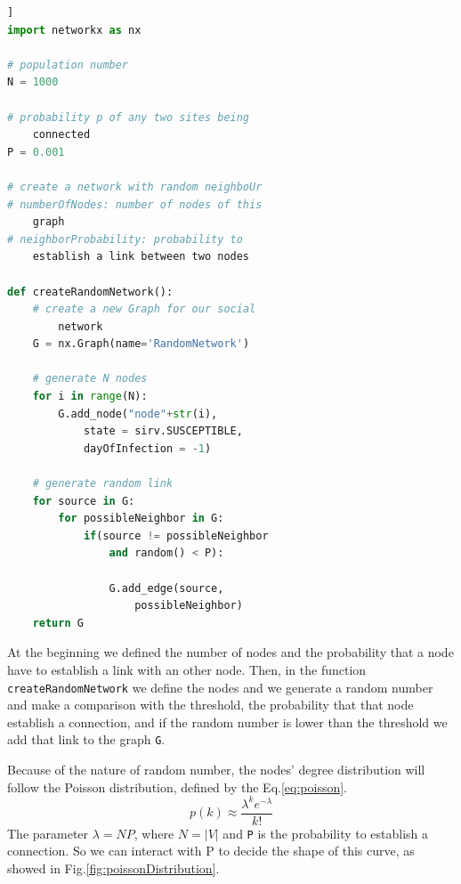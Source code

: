         \begin{lstlisting}[language=Python, frame=single]]
import networkx as nx

# population number
N = 1000

# probability p of any two sites being
    connected
P = 0.001

# create a network with random neighboUr
# numberOfNodes: number of nodes of this
    graph
# neighborProbability: probability to 
    establish a link between two nodes
    
def createRandomNetwork():
    # create a new Graph for our social
        network
    G = nx.Graph(name='RandomNetwork')
    
    # generate N nodes
    for i in range(N):
        G.add_node("node"+str(i), 
            state = sirv.SUSCEPTIBLE,
            dayOfInfection = -1)

    # generate random link
    for source in G:
        for possibleNeighbor in G:
            if(source != possibleNeighbor
                and random() < P):
                
                G.add_edge(source,
                    possibleNeighbor)
    return G
        \end{lstlisting}
        
        At the beginning we defined the number of nodes and the probability that a node have to establish a link with an other node. Then, in the function \verb|createRandomNetwork| we define the nodes and we generate a random number and make a comparison with the threshold, the probability that that node establish a connection, and if the random number is lower than the threshold we add that link to the graph \verb|G|.
        
        Because of the nature of random number, the nodes' degree distribution will follow the Poisson distribution, defined by the Eq.\ref{eq:poisson}.
        \begin{equation}\label{eq:poisson}
          p(k) \approx \frac{\lambda^ke^{-\lambda}}{k!}
        \end{equation}
        The parameter $\lambda = N P$, where $N = |V|$ and \verb|P| is the probability to establish a connection. So we can interact with P to decide the shape of this curve, as showed in Fig.\ref{fig:poissonDistribution}\cite{wiky-Poisson}.
        
